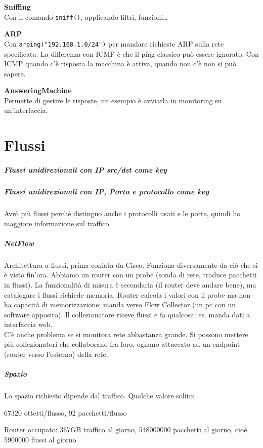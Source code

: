 \documentclass[10pt]{book}
\begin{document}
\begin{list}{}{}
	\item \textbf{Sniffing}\\
	Con il comando \texttt{sniff()}, applicando filtri, funzioni\ldots\\
	\item \textbf{ARP}\\
	Con \texttt{arping("192.168.1.0/24")} per mandare richieste ARP sulla rete specificata. La differenza con ICMP è che il ping classico può essere ignorato. Con ICMP quando c'è risposta la macchina è attiva, quando non c'è non si può sapere.
	\item \textbf{AnsweringMachine}\\
	Permette di gestire le risposte, un esempio è avviarla in monitoring su un'interfaccia. 
\end{list}
\chapter{Flussi}
\paragraph{Flussi unidirezionali con IP src/dst come key}
\paragraph{Flussi unidirezionali con IP, Porta e protocollo come key} Avrò più flussi perché distinguo anche i protocolli usati e le porte, quindi ho maggiore informazione sul traffico.
\paragraph{NetFlow} Architettura a flussi, prima coniata da Cisco. Funziona diversamente da ciò che si è visto fin'ora. Abbiamo un router con un probe (sonda di rete, traduce pacchetti in flussi). La funzionalità di misura è secondaria (il router deve andare bene), ma catalogare i flussi richiede memoria. Router calcola i valori con il probe ma non ha capacità di memorizzazione: manda verso Flow Collector (un pc con un software apposito). Il collezionatore riceve flussi e fa qualcosa: es. manda dati a interfaccia web.\\
C'è anche problema se si monitora rete abbastanza grande. Si possono mettere più collezionatori che collaborano fra loro, ognuno attaccato ad un endpoint (router verso l'esterno) della rete.
\paragraph{Spazio} Lo spazio richiesto dipende dal traffico. Qualche valore solito:
\begin{list}{}{}
	\item 67320 ottetti/flusso, 92 pacchetti/flusso
	\item Router occupato: 367GB traffico al giorno, 548000000 pacchetti al giorno, cioè 5900000 flussi al giorno
	\item %
\end{list}
\end{document}
